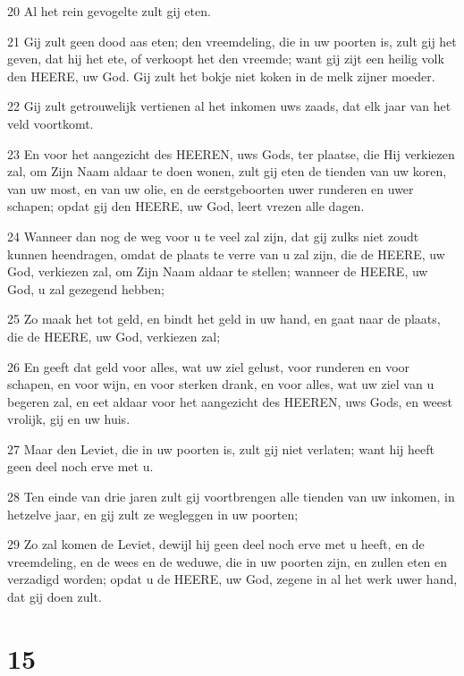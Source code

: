 \par 20 Al het rein gevogelte zult gij eten.
\par 21 Gij zult geen dood aas eten; den vreemdeling, die in uw poorten is, zult gij het geven, dat hij het ete, of verkoopt het den vreemde; want gij zijt een heilig volk den HEERE, uw God. Gij zult het bokje niet koken in de melk zijner moeder.
\par 22 Gij zult getrouwelijk vertienen al het inkomen uws zaads, dat elk jaar van het veld voortkomt.
\par 23 En voor het aangezicht des HEEREN, uws Gods, ter plaatse, die Hij verkiezen zal, om Zijn Naam aldaar te doen wonen, zult gij eten de tienden van uw koren, van uw most, en van uw olie, en de eerstgeboorten uwer runderen en uwer schapen; opdat gij den HEERE, uw God, leert vrezen alle dagen.
\par 24 Wanneer dan nog de weg voor u te veel zal zijn, dat gij zulks niet zoudt kunnen heendragen, omdat de plaats te verre van u zal zijn, die de HEERE, uw God, verkiezen zal, om Zijn Naam aldaar te stellen; wanneer de HEERE, uw God, u zal gezegend hebben;
\par 25 Zo maak het tot geld, en bindt het geld in uw hand, en gaat naar de plaats, die de HEERE, uw God, verkiezen zal;
\par 26 En geeft dat geld voor alles, wat uw ziel gelust, voor runderen en voor schapen, en voor wijn, en voor sterken drank, en voor alles, wat uw ziel van u begeren zal, en eet aldaar voor het aangezicht des HEEREN, uws Gods, en weest vrolijk, gij en uw huis.
\par 27 Maar den Leviet, die in uw poorten is, zult gij niet verlaten; want hij heeft geen deel noch erve met u.
\par 28 Ten einde van drie jaren zult gij voortbrengen alle tienden van uw inkomen, in hetzelve jaar, en gij zult ze wegleggen in uw poorten;
\par 29 Zo zal komen de Leviet, dewijl hij geen deel noch erve met u heeft, en de vreemdeling, en de wees en de weduwe, die in uw poorten zijn, en zullen eten en verzadigd worden; opdat u de HEERE, uw God, zegene in al het werk uwer hand, dat gij doen zult.

\chapter{15}

